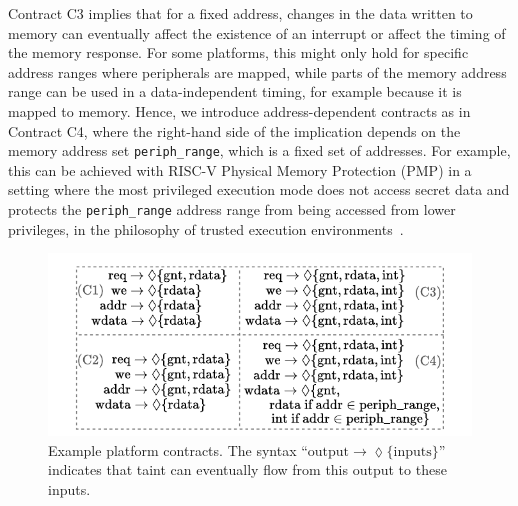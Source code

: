 Contract C3 implies that for a fixed address, changes in the data written to memory can eventually affect the existence of an interrupt or affect the timing of the memory response.
For some platforms, this might only hold for specific address ranges where peripherals are mapped, while parts of the memory address range can be used in a data-independent timing, for example because it is mapped to memory.
Hence, we introduce address-dependent contracts as in Contract C4, where the right-hand side of the implication depends on the memory address set \texttt{periph\_range}, which is a fixed set of addresses.
For example, this can be achieved with RISC-V Physical Memory Protection (PMP) in a setting where the most privileged execution mode does not access secret data and protects the \texttt{periph\_range} address range from being accessed from lower privileges, in the philosophy of trusted execution environments~\cite{lee2019keystone,costan2016sanctum,arm2009trustzone,mcgillion2015opentee,bourgeat2018mi6,brasser2022tcx}.



\begin{figure}
    \begin{center}
    \includegraphics[width=\columnwidth]{figures/contract_equations/contract_equations.pdf}
    \end{center}
    \vspace{-1.8em}
    \caption{Example platform contracts. The syntax ``$\text{output} \rightarrow \lozenge \{ \text{inputs} \}$'' indicates that taint can eventually flow from this output to these inputs.}
    \label{fig:contract_equations}
    \vspace*{-1.5em} 
\end{figure}

